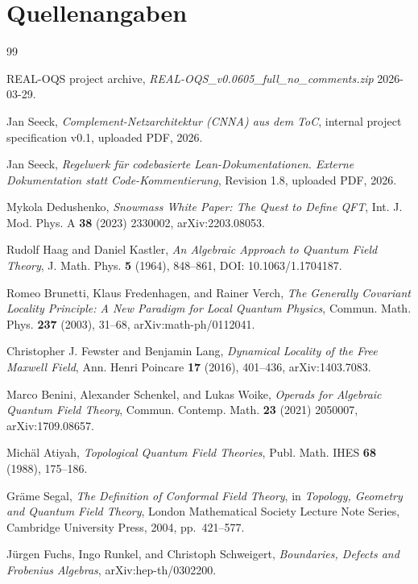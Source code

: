 \documentclass[11pt,a4paper]{article}
\begin{document}
\endgroup
\section{Quellenangaben}
\begin{thebibliography}{99}

REAL-OQS project archive,
\emph{REAL-OQS\_v0.0605\_full\_no\_comments.zip} 2026-03-29.

Jan Seeck,
\emph{Complement-Netzarchitektur (CNNA) aus dem ToC}, internal project specification v0.1,
uploaded PDF, 2026.

Jan Seeck,
\emph{Regelwerk für codebasierte Lean-Dokumentationen. Externe Dokumentation statt Code-Kommentierung},
Revision 1.8, uploaded PDF, 2026.

Mykola Dedushenko,
\emph{Snowmass White Paper: The Quest to Define QFT},
Int. J. Mod. Phys. A \textbf{38} (2023) 2330002,
arXiv:2203.08053.

Rudolf Haag and Daniel Kastler,
\emph{An Algebraic Approach to Quantum Field Theory},
J. Math. Phys. \textbf{5} (1964), 848--861,
DOI: 10.1063/1.1704187.

Romeo Brunetti, Klaus Fredenhagen, and Rainer Verch,
\emph{The Generally Covariant Locality Principle: A New Paradigm for Local Quantum Physics},
Commun. Math. Phys. \textbf{237} (2003), 31--68,
arXiv:math-ph/0112041.

Christopher J. Fewster and Benjamin Lang,
\emph{Dynamical Locality of the Free Maxwell Field},
Ann. Henri Poincare \textbf{17} (2016), 401--436,
arXiv:1403.7083.

Marco Benini, Alexander Schenkel, and Lukas Woike,
\emph{Operads for Algebraic Quantum Field Theory},
Commun. Contemp. Math. \textbf{23} (2021) 2050007,
arXiv:1709.08657.

Michäl Atiyah,
\emph{Topological Quantum Field Theories},
Publ. Math. IHES \textbf{68} (1988), 175--186.

Gräme Segal,
\emph{The Definition of Conformal Field Theory},
in \emph{Topology, Geometry and Quantum Field Theory}, London Mathematical Society Lecture Note Series,
Cambridge University Press, 2004, pp.~421--577.

Jürgen Fuchs, Ingo Runkel, and Christoph Schweigert,
\emph{Boundaries, Defects and Frobenius Algebras},
arXiv:hep-th/0302200.


\end{thebibliography}
\end{document}
